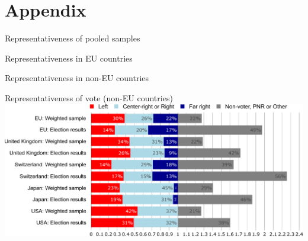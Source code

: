 \documentclass[aspectratio=169,xcolor=dvipsnames, 11pt,mathserif]{beamer}
\begin{document}
\appendix 
\section{Appendix}

\begin{frame}{Representativeness of pooled samples \hyperlink{data}{} \label{representativeness}}
    \vspace{-.6cm}
    \begin{table}[h]
        \makebox[\textwidth][c]{
            \resizebox*{!}{1.4\textheight}{
            
            }
        }
    \end{table}  
\end{frame}

\begin{frame}{Representativeness in EU countries \hyperlink{data}{} \label{representativeness}}
    \vspace{-.6cm}
    \begin{table}[h]
        \makebox[\textwidth][c]{
            \resizebox*{!}{.97\textheight}{
            
            }
        }
    \end{table}  
\end{frame}

\begin{frame}{Representativeness in non-EU countries \hyperlink{data}{} \label{representativeness}}
    \vspace{-.6cm}
    \begin{table}[h]
        \makebox[\textwidth][c]{
            \resizebox*{!}{.97\textheight}{
            
            }
        }
    \end{table}  
\end{frame}

\begin{frame}{Representativeness of vote (non-EU countries)  \hyperlink{data}{}}
\includegraphics[height=.95\textheight]{../figures/country_comparison/vote_non_EU_pnr_out.pdf}
\end{frame}
\end{document}
